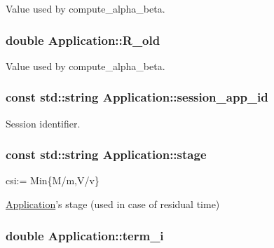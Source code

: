Value used by compute\-\_\-alpha\-\_\-beta. 

\hypertarget{classApplication_a950cfc8da4a8e4640aee8d2840f53e0e}{
\subsubsection[{R\-\_\-old}]{\setlength{\rightskip}{0pt plus 5cm}double Application\-::\-R\-\_\-old\hspace{0.3cm}{\ttfamily [private]}}}\label{classApplication_a950cfc8da4a8e4640aee8d2840f53e0e}


Value used by compute\-\_\-alpha\-\_\-beta. 

\hypertarget{classApplication_a6152c40564d526b9b60871c98f7a51c7}{
\subsubsection[{session\-\_\-app\-\_\-id}]{\setlength{\rightskip}{0pt plus 5cm}const std\-::string Application\-::session\-\_\-app\-\_\-id\hspace{0.3cm}{\ttfamily [private]}}}\label{classApplication_a6152c40564d526b9b60871c98f7a51c7}


Session identifier. 

\hypertarget{classApplication_a27731ed4d16f6e9583b52c4f09a69258}{
\subsubsection[{stage}]{\setlength{\rightskip}{0pt plus 5cm}const std\-::string Application\-::stage\hspace{0.3cm}{\ttfamily [private]}}}\label{classApplication_a27731ed4d16f6e9583b52c4f09a69258}


csi\-:= Min\{M/m,V/v\} 

\hyperlink{classApplication}{Application}'s stage (used in case of residual time) \hypertarget{classApplication_ad5486702327ad61e56ed04fb54d58c20}{
\subsubsection[{term\-\_\-i}]{\setlength{\rightskip}{0pt plus 5cm}double Application\-::term\-\_\-i\hspace{0.3cm}{\ttfamily [private]}}}\label{classApplication_ad5486702327ad61e56ed04fb54d58c20}


